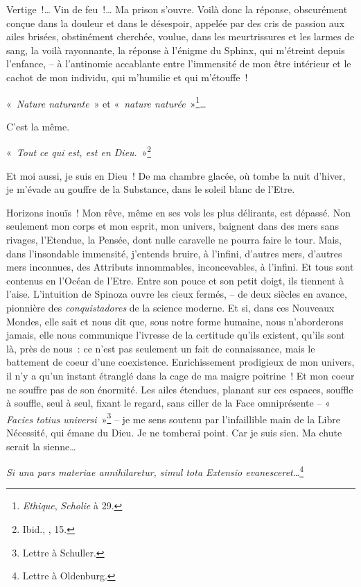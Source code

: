 Vertige~!\ldots{} Vin de feu~!\ldots{} Ma prison s'ouvre. Voilà donc la réponse,
obscurément conçue dans la douleur et dans le désespoir, appelée par des
cris de passion aux ailes brisées, obstinément cherchée, voulue, dans
les meurtrissures et les larmes de sang, la voilà rayonnante, la réponse
à l'énigme du Sphinx, qui m'étreint depuis l'enfance, -- à l'antinomie
accablante entre l'immensité de mon être intérieur et le cachot de mon
individu, qui m'humilie et qui m'étouffe~!

«~\emph{Nature naturante}~» et «~\emph{nature naturée}~»\footnote{\emph{Ethique},
   \emph{Scholie} à 29.}\ldots{}

C'est la même.

«~\emph{Tout ce qui est, est en Dieu}.~»\footnote{Ibid., , 15.}

Et moi aussi, je suis en Dieu~! De ma chambre glacée, où tombe la nuit
d'hiver, je m'évade au gouffre de la Substance, dans le soleil blanc de
l'Etre.

Horizons inouïs~! Mon rêve, même en ses vols les plus délirants, est
dépassé. Non seulement mon corps et mon esprit, mon univers, baignent
dans des mers sans rivages, l'Etendue, la Pensée, dont nulle caravelle
ne pourra faire le tour. Mais, dans l'insondable immensité, j'entends
bruire, à l'infini, d'autres mers, d'autres mers inconnues, des
Attributs innommables, inconcevables, à l'infini. Et tous sont contenus
en l'Océan de l'Etre. Entre son pouce et son petit doigt, ils tiennent à
l'aise. L'intuition de Spinoza ouvre les cieux fermés, -- de deux
siècles en avance, pionnière des \emph{conquistadores} de la science
moderne. Et si, dans ces Nouveaux Mondes, elle sait et nous dit que,
sous notre forme humaine, nous n'aborderons jamais, elle nous communique
l'ivresse de la certitude qu'ils existent, qu'ils sont là, près de
nous~: ce n'est pas seulement un fait de connaissance, mais le battement
de coeur d'une coexistence. Enrichissement prodigieux de mon univers, il
n'y a qu'un instant étranglé dans la cage de ma maigre poitrine~! Et mon
coeur ne souffre pas de son énormité. Les ailes étendues, planant sur
ces espaces, souffle à souffle, seul à seul, fixant le regard, sans
ciller de la Face omniprésente -- «~ \emph{Facies totius
universi}~»\footnote{Lettre  à Schuller.} -- je me sens soutenu par
l'infaillible main de la Libre Nécessité, qui émane du Dieu. Je ne
tomberai point. Car je suis sien. Ma chute serait la sienne\ldots{}

\emph{Si una pars materiae annihilaretur, simul tota Extensio
evanesceret\ldots{}}\footnote{Lettre \sout{} à Oldenburg.}

